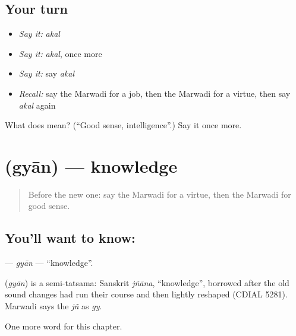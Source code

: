 \subsection*{Your turn}
\begin{itemize}
\raggedright
  \item \emph{Say it:} \emph{akal}
  \item \emph{Say it:} \emph{akal}, once more
  \item \emph{Say it:} say \emph{akal}
  \item \emph{Recall:} say the Marwadi for a job, then the Marwadi for a virtue, then say \emph{akal} again
\end{itemize}

\begin{tcolorbox}[breakable,colback=teal!4,colframe=teal!35!black,title={Before you move on}]
What does  mean? (\textquotedblleft{}Good sense, intelligence\textquotedblright{}.) Say it once more.
\end{tcolorbox}
\section[\texorpdfstring{\mw{ग्यान} (gyān)}{ग्यान (gyān)}]{ (gyān) — knowledge}

\label{lesson:MW-C116-gyan}



\begin{quote}
Before the new one: say the Marwadi for a virtue, then the Marwadi for good sense.
\end{quote}

\subsection*{You'll want to know: }
\textbf{} — \emph{gyān} — \textquotedblleft{}knowledge\textquotedblright{}.

\begin{cousinweb}
\textbf{} (\emph{gyān}) is a semi-tatsama: Sanskrit \emph{jñāna}, \textquotedblleft{}knowledge\textquotedblright{}, borrowed after the old sound changes had run their course and then lightly reshaped (CDIAL 5281). Marwadi says the \emph{jñ} as \emph{gy}.
\end{cousinweb}

\begin{grammarlens}[title={What you've built}]
One more word for this chapter.
\end{grammarlens}

